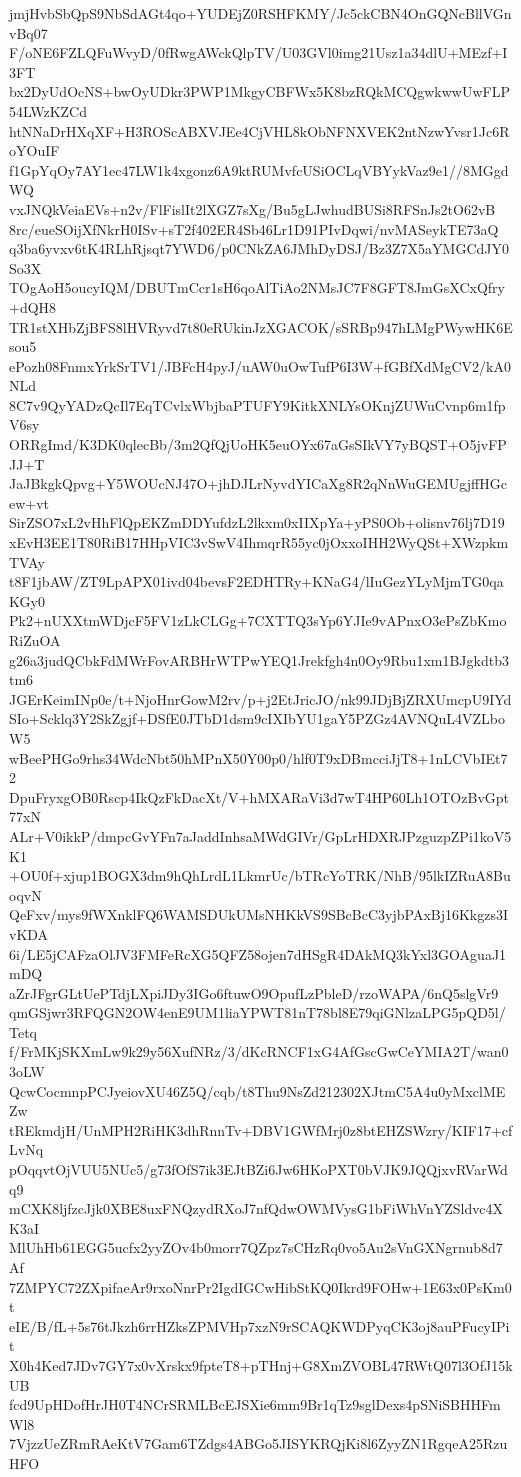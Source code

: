 jmjHvbSbQpS9NbSdAGt4qo+YUDEjZ0RSHFKMY/Jc5ckCBN4OnGQNcBllVGnvBq07
F/oNE6FZLQFuWvyD/0fRwgAWckQlpTV/U03GVl0img21Usz1a34dlU+MEzf+I3FT
bx2DyUdOcNS+bwOyUDkr3PWP1MkgyCBFWx5K8bzRQkMCQgwkwwUwFLP54LWzKZCd
htNNaDrHXqXF+H3ROScABXVJEe4CjVHL8kObNFNXVEK2ntNzwYvsr1Jc6RoYOuIF
f1GpYqOy7AY1ec47LW1k4xgonz6A9ktRUMvfcUSiOCLqVBYykVaz9e1//8MGgdWQ
vxJNQkVeiaEVs+n2v/FlFislIt2lXGZ7sXg/Bu5gLJwhudBUSi8RFSnJs2tO62vB
8rc/eueSOijXfNkrH0ISv+sT2f402ER4Sb46Lr1D91PIvDqwi/nvMASeykTE73aQ
q3ba6yvxv6tK4RLhRjsqt7YWD6/p0CNkZA6JMhDyDSJ/Bz3Z7X5aYMGCdJY0So3X
TOgAoH5oucyIQM/DBUTmCcr1sH6qoAlTiAo2NMsJC7F8GFT8JmGsXCxQfry+dQH8
TR1stXHbZjBFS8lHVRyvd7t80eRUkinJzXGACOK/sSRBp947hLMgPWywHK6Esou5
ePozh08FnmxYrkSrTV1/JBFcH4pyJ/uAW0uOwTufP6I3W+fGBfXdMgCV2/kA0NLd
8C7v9QyYADzQcIl7EqTCvlxWbjbaPTUFY9KitkXNLYsOKnjZUWuCvnp6m1fpV6sy
ORRgImd/K3DK0qlecBb/3m2QfQjUoHK5euOYx67aGsSIkVY7yBQST+O5jvFPJJ+T
JaJBkgkQpvg+Y5WOUcNJ47O+jhDJLrNyvdYICaXg8R2qNnWuGEMUgjffHGcew+vt
SirZSO7xL2vHhFlQpEKZmDDYufdzL2lkxm0xIIXpYa+yPS0Ob+olisnv76lj7D19
xEvH3EE1T80RiB17HHpVIC3vSwV4IhmqrR55yc0jOxxoIHH2WyQSt+XWzpkmTVAy
t8F1jbAW/ZT9LpAPX01ivd04bevsF2EDHTRy+KNaG4/lIuGezYLyMjmTG0qaKGy0
Pk2+nUXXtmWDjcF5FV1zLkCLGg+7CXTTQ3sYp6YJIe9vAPnxO3ePsZbKmoRiZuOA
g26a3judQCbkFdMWrFovARBHrWTPwYEQ1Jrekfgh4n0Oy9Rbu1xm1BJgkdtb3tm6
JGErKeimINp0e/t+NjoHnrGowM2rv/p+j2EtJricJO/nk99JDjBjZRXUmcpU9IYd
SIo+Scklq3Y2SkZgjf+DSfE0JTbD1dsm9cIXIbYU1gaY5PZGz4AVNQuL4VZLboW5
wBeePHGo9rhs34WdcNbt50hMPnX50Y00p0/hlf0T9xDBmcciJjT8+1nLCVbIEt72
DpuFryxgOB0Rscp4IkQzFkDacXt/V+hMXARaVi3d7wT4HP60Lh1OTOzBvGpt77xN
ALr+V0ikkP/dmpcGvYFn7aJaddInhsaMWdGIVr/GpLrHDXRJPzguzpZPi1koV5K1
+OU0f+xjup1BOGX3dm9hQhLrdL1LkmrUc/bTRcYoTRK/NhB/95lkIZRuA8BuoqvN
QeFxv/mys9fWXnklFQ6WAMSDUkUMsNHKkVS9SBcBcC3yjbPAxBj16Kkgzs3IvKDA
6i/LE5jCAFzaOlJV3FMFeRcXG5QFZ58ojen7dHSgR4DAkMQ3kYxl3GOAguaJ1mDQ
aZrJFgrGLtUePTdjLXpiJDy3IGo6ftuwO9OpufLzPbleD/rzoWAPA/6nQ5slgVr9
qmGSjwr3RFQGN2OW4enE9UM1liaYPWT81nT78bl8E79qiGNlzaLPG5pQD5l/Tetq
f/FrMKjSKXmLw9k29y56XufNRz/3/dKcRNCF1xG4AfGscGwCeYMIA2T/wan03oLW
QcwCocmnpPCJyeiovXU46Z5Q/cqb/t8Thu9NsZd212302XJtmC5A4u0yMxclMEZw
tREkmdjH/UnMPH2RiHK3dhRnnTv+DBV1GWfMrj0z8btEHZSWzry/KIF17+cfLvNq
pOqqvtOjVUU5NUc5/g73fOfS7ik3EJtBZi6Jw6HKoPXT0bVJK9JQQjxvRVarWdq9
mCXK8ljfzcJjk0XBE8uxFNQzydRXoJ7nfQdwOWMVysG1bFiWhVnYZSldvc4XK3aI
MlUhHb61EGG5ucfx2yyZOv4b0morr7QZpz7sCHzRq0vo5Au2sVnGXNgrnub8d7Af
7ZMPYC72ZXpifaeAr9rxoNnrPr2IgdIGCwHibStKQ0Ikrd9FOHw+1E63x0PsKm0t
eIE/B/fL+5s76tJkzh6rrHZksZPMVHp7xzN9rSCAQKWDPyqCK3oj8auPFucyIPit
X0h4Ked7JDv7GY7x0vXrskx9fpteT8+pTHnj+G8XmZVOBL47RWtQ07l3OfJ15kUB
fcd9UpHDofHrJH0T4NCrSRMLBcEJSXie6mm9Br1qTz9sglDexs4pSNiSBHHFmWl8
7VjzzUeZRmRAeKtV7Gam6TZdgs4ABGo5JISYKRQjKi8l6ZyyZN1RgqeA25RzuHFO
